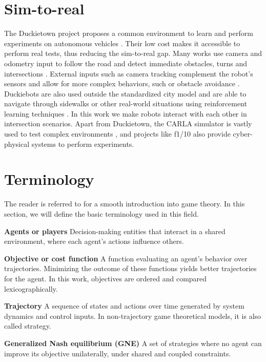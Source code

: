 \section{Sim-to-real}
\label{sec:sim-to-real}
The Duckietown project proposes a common environment to learn and perform experiments on autonomous vehicles \cite{duckietown:2017}. Their low cost makes it accessible to perform real tests, thus reducing the sim-to-real gap. Many works use camera and odometry input to follow the road and detect immediate obstacles, turns and intersections \cite{castro:2019}.
External inputs such as camera tracking complement the robot's sensors and allow for more complex behaviors, such or obstacle
avoidance \cite{candela:2022}.
Duckiebots are also used outside the standardized city model and are able to navigate through sidewalks or other real-world situations using reinforcement learning techniques \cite{kahn:2021}.
In this work we make robots interact with each other in intersection scenarios.
Apart from Duckietown, the CARLA simulator is vastly used to test complex environments \cite{carla:2017}, and projects like f1/10 \cite{f110:2019} also provide cyber-physical systems to perform experiments.

\section{Terminology}

The reader is referred to \cite{fridovich-keil:2024} for a smooth introduction
into game theory. In this section, we will define the basic terminology used in
this field.

\smallskip \noindent
\textbf{Agents or players} \quad
Decision-making entities that interact in a shared environment, where each agent's actions influence others.

\smallskip \noindent
\textbf{Objective or cost function} \quad
A function evaluating an agent's behavior over trajectories.
Minimizing the outcome of these functions yields better trajectories for the agent.
In this work, objectives are ordered and compared lexicographically.

\smallskip \noindent
\textbf{Trajectory} \quad
A sequence of states and actions over time generated by system dynamics and control inputs.
In non-trajectory game theoretical models, it is also called strategy.

\smallskip \noindent
\textbf{Generalized Nash equilibrium (GNE)} \quad
A set of strategies where no agent can improve its objective unilaterally, under shared and coupled constraints.

